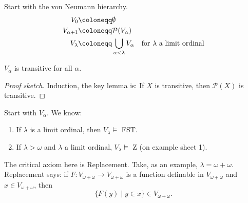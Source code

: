 \documentclass{article}
\let\models\vDash
\begin{document}
\newlec Start with the von Neumann hierarchy.
\begin{align*}
  V_0 &\coloneqq \emptyset \\
  V_{\alpha+1} &\coloneqq \mathcal{P}(V_\alpha) \\
  V_\lambda &\coloneqq \bigcup_{\alpha < \lambda} V_\alpha \smash{\quad \text{for } \lambda \text{ a limit ordinal}}
\end{align*}
\begin{prop}
  $V_\alpha$ is transitive for all $\alpha$.
\end{prop}
\begin{proof}[Proof sketch]
  Induction, the key lemma is: If $X$ is transitive, then $\mathcal{P}(X)$ is transitive.
\end{proof}
Start with $V_\alpha$. We know:
\begin{enumerate}
  \item If $\lambda$ is a limit ordinal, then $V_\lambda \models$ \textsf{FST}.
  \item If $\lambda > \omega$ and $\lambda$ a limit ordinal, $V_\lambda \vDash$ \textsf{Z} (on example sheet 1).
\end{enumerate}
The critical axiom here is Replacement.
Take, as an example, $\lambda = \omega + \omega$.
Replacement says: if $F: V_{\omega + \omega} \to V_{\omega+\omega}$ is a function definable in $V_{\omega+\omega}$ and $x \in V_{\omega + \omega}$, then
\begin{equation*}
  \{F(y) \mid y \in x\} \in V_{\omega + \omega}.
\end{equation*}
\begin{center}
\end{center}
\end{document}
